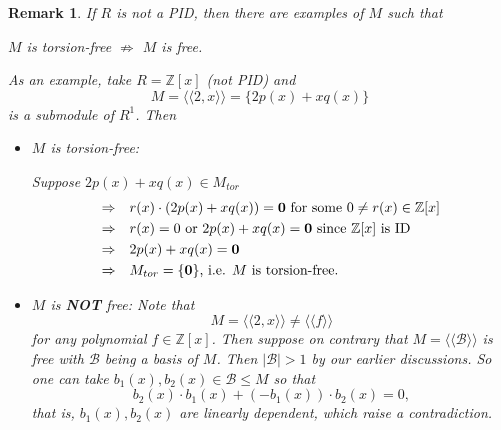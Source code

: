 \documentclass[12pt]{amsbook}
\newtheorem{remark}[theorem]{Remark}
\begin{document}
\begin{remark}
    If $R$ is not a PID, then there are examples of $M$ such that
    \begin{center}
        $M$ is torsion-free $\not\Rightarrow$ $M$ is free.
    \end{center}
    As an example, take $R=\mathbb{Z}[x]$ (not PID) and
    $$M=\langle\langle 2,x\rangle\rangle=\{2p(x)+xq(x)\}$$
    is a submodule of $R^1$. Then
    \begin{itemize}
        \item $M$ is torsion-free:

        Suppose $2p(x)+xq(x)\in M_{tor}$
        \begin{align*}
            \Rightarrow &\quad r(x)\cdot(2p(x)+xq(x))={\bf 0}\text{ for some $0\neq r(x)\in\mathbb{Z}[x]$}\\
            \Rightarrow &\quad r(x)=0\text{ or }2p(x)+xq(x)={\bf 0}\text{ since }\mathbb{Z}[x]\text{ is ID}\\
            \Rightarrow &\quad2p(x)+xq(x)={\bf 0}\\
            \Rightarrow &\quad M_{tor}=\{{\bf 0}\}\text{, i.e. }M\text{ is torsion-free.}
        \end{align*}
        \item $M$ is {\bf NOT} free: Note that
        $$M=\langle\langle 2,x\rangle\rangle\neq\langle\langle f\rangle\rangle$$
        for any polynomial $f\in \mathbb{Z}[x]$. Then suppose on contrary that $M=\langle\langle\mathcal{B}\rangle\rangle$ is free with $\mathcal{B}$ being a basis of $M$. Then $|\mathcal{B}|>1$ by our earlier discussions. So one can take $b_1(x),b_2(x)\in\mathcal{B}\leq M$ so that
        $$b_2(x)\cdot b_1(x)+(-b_1(x))\cdot b_2(x)=0,$$
        that is, $b_1(x),b_2(x)$ are linearly dependent, which raise a contradiction.
    \end{itemize}
\end{remark}
\end{document}
